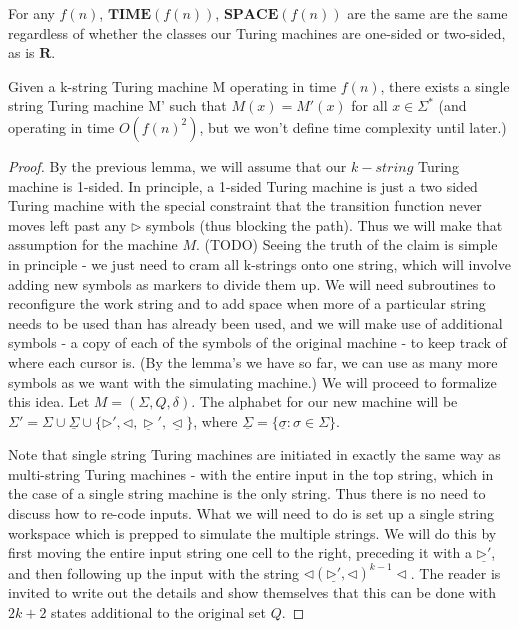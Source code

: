 \begin{corollary}
	For any $f(n)$, $\bm{TIME}(f(n))$, $\bm{SPACE}(f(n))$ are the same are the same regardless of whether the classes our Turing machines are one-sided or two-sided, as is $\bm{R}$. 
\end{corollary}
\begin{theorem}
Given a k-string Turing machine M operating in time $f(n)$, there exists a single string Turing machine M' such that $M(x)=M'(x)$ for all $x\in \Sigma^*$ (and operating in time $O(f(n)^2)$, but we won't define time complexity until later.)
\end{theorem}
\begin{proof}
	By the previous lemma, we will assume that our $k-string$ Turing machine is 1-sided. In principle, a 1-sided Turing machine is just a two sided Turing machine with the special constraint that the transition function never moves left past any $\triangleright$ symbols (thus blocking the path). Thus we will make that assumption for the machine $M$. (TODO) Seeing the truth of the claim is simple in principle - we just need to cram all k-strings onto one string, which will involve adding new symbols as markers to divide them up. We will need subroutines to reconfigure the work string and to add space when more of a particular string needs to be used than has already been used, and we will make use of additional symbols - a copy of each of the symbols of the original machine - to keep track of where each cursor is. (By the lemma's we have so far, we can use as many more symbols as we want with the simulating machine.) We will proceed to formalize this idea. Let $M = (\Sigma,Q,\delta)$. The alphabet for our new machine will be $\Sigma' = \Sigma \cup \underline{\Sigma} \cup \{\triangleright',\triangleleft, \underline{\triangleright}',\underline{\triangleleft}\}$, where $\underline{\Sigma} = \{ \underline{\sigma}: \sigma \in \Sigma \}$.

	Note that single string Turing machines are initiated in exactly the same way as multi-string Turing machines - with the entire input in the top string, which in the case of a single string machine is the only string. Thus there is no need to discuss how to re-code inputs. What we will need to do is set up a single string workspace which is prepped to simulate the multiple strings. We will do this by first moving the entire input string one cell to the right, preceding it with a $\underline{\triangleright'}$, and then following up the input with the string $\triangleleft(\underline{\triangleright'},\triangleleft)^{k-1}\triangleleft$. The reader is invited to write out the details and show themselves that this can be done with $2k+2$ states additional to the original set $Q$.


\end{proof}
